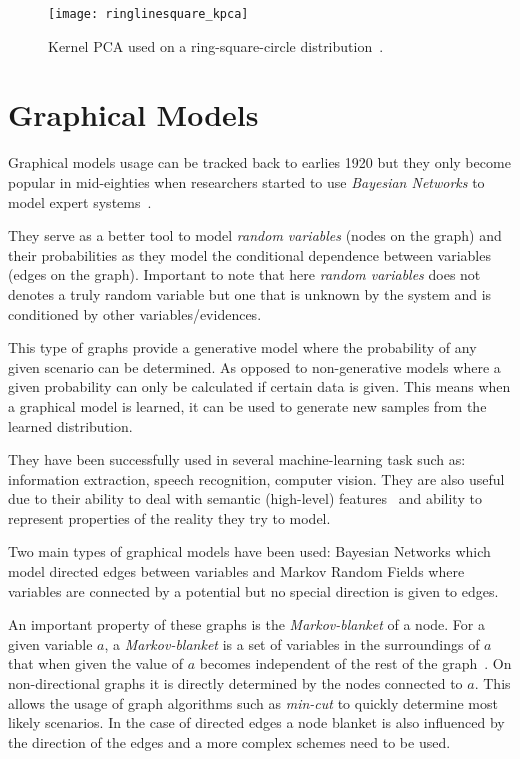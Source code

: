 \begin{figure}
\center
\texttt{[image: ringlinesquare\_kpca]}
\caption{{Kernel PCA} used on a ring-square-circle distribution~\citep{Hoffmann2007863}.}
\end{figure}

\section{Graphical Models}
\label{sec:graphical-models}
Graphical models usage can be tracked back to earlies 1920 but they only become popular in mid-eighties when researchers started to use \emph{Bayesian Networks} to model expert systems~\citep{borgelt2002graphical}.

They serve as a better tool to model \emph{random variables} (nodes on the graph) and their probabilities as they model the conditional dependence between variables (edges on the graph).
Important to note that here \emph{random variables} does not denotes a truly random variable but one that is unknown by the system and is conditioned by other variables/evidences.

This type of graphs provide a generative model where the probability of any given scenario can be determined. As opposed to non-generative models where a given probability can only be calculated if certain data is given.
This means when a graphical model is learned, it can be used to generate new samples from the learned distribution.

They have been successfully used in several machine-learning task such as: information extraction, speech recognition, computer vision. They are also useful due to their ability to deal with semantic (high-level) features~\citep{boutell2006factor} and ability to represent properties of the reality they try to model.

Two main types of graphical models have been used: Bayesian Networks which model directed edges between variables and Markov Random Fields where variables are connected by a potential but no special direction is given to edges.

An important property of these graphs is the \emph{Markov-blanket} of a node.
For a given variable $a$, a \emph{Markov-blanket} is a set of variables in the surroundings of $a$ that when given the value of $a$ becomes independent of the rest of the graph~\citep{pearl1988probabilistic}.
On non-directional graphs it is directly determined by the nodes connected to $a$.
This allows the usage of graph algorithms such as \emph{min-cut} to quickly determine most likely scenarios.
In the case of directed edges a node blanket is also influenced by the direction of the edges and a more complex schemes need to be used.

